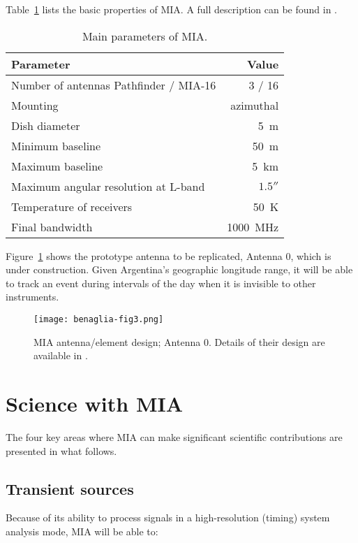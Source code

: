 \documentclass[baaa]{baaa}
\begin{document}
Table~\ref{tab:miaparameters} lists the basic properties of  MIA. A full description can be found in \citet{gancio2024}.


\begin{table}[!h]
\centering
\caption{Main parameters of MIA.}
\begin{tabular}{lr}
\hline\hline\noalign{\smallskip}
\!\!Parameter & Value \\
\hline\noalign{\smallskip}
Number of antennas Pathfinder / MIA-16 & 3 / 16\\
Mounting & azimuthal\\
Dish diameter & 5~m\\
Minimum baseline & 50~m\\
Maximum baseline & 5~km\\
Maximum angular resolution at L-band & $1.5''$\\
Temperature of receivers & 50~K\\
Final bandwidth & 1000~MHz\\
\hline
\end{tabular}
\label{tab:miaparameters}
\end{table}

Figure~\ref{fig:antenamia} shows the prototype antenna to be replicated, Antenna 0, which is under construction. Given Argentina's geographic longitude range, it will be able to track an event during intervals of the day when it is invisible to other instruments.   

\begin{figure}[!h]
\centering
\texttt{[image: benaglia-fig3.png]}
\caption{MIA antenna/element design; Antenna 0. Details of their design are available in \citet{gancio2024}.}
\label{fig:antenamia}
\end{figure}


\section{Science with MIA}

The four key areas where MIA can make significant scientific contributions are presented in what follows. 

\subsection{Transient sources}
Because of its ability to process signals in a high-resolution (timing) system analysis mode, MIA will be able to:
\end{document}
